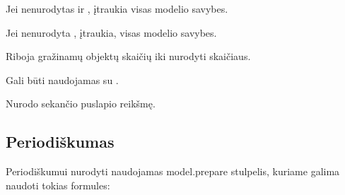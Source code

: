\documentclass[letterpaper,10pt,lithuanian]{sphinxmanual}
\begin{document}
\begin{fulllineitems}
\begin{fulllineitems}
\sphinxAtStartPar
Jei nenurodytas  ir , įtraukia visas {\hyperref[\detokenize{formatas:base}]{}} modelio savybes.

\sphinxAtStartPar
Jei nenurodyta , įtraukia, visas  modelio savybes.

\end{fulllineitems}


\begin{fulllineitems}
\label{\detokenize{formules:limit}}
\pysigstartsignatures
\pysiglinewithargsret
{}
{}
{}
\pysigstopsignatures
\sphinxAtStartPar
Riboja gražinamų objektų skaičių iki nurodyti  skaičiaus.

\sphinxAtStartPar
Gali būti naudojamas su {\hyperref[\detokenize{formules:page}]{}}.

\end{fulllineitems}


\begin{fulllineitems}
\label{\detokenize{formules:page}}
\pysigstartsignatures
\pysiglinewithargsret
{}
{}
{}
\pysigstopsignatures
\sphinxAtStartPar
Nurodo sekančio  puslapio reikšmę.

\end{fulllineitems}


\end{fulllineitems}



\subsection{Periodiškumas}
\label{\detokenize{formules:periodiskumas}}
\sphinxAtStartPar
Periodiškumui nurodyti naudojamas model.prepare stulpelis, kuriame galima
naudoti tokias formules:
\end{document}

